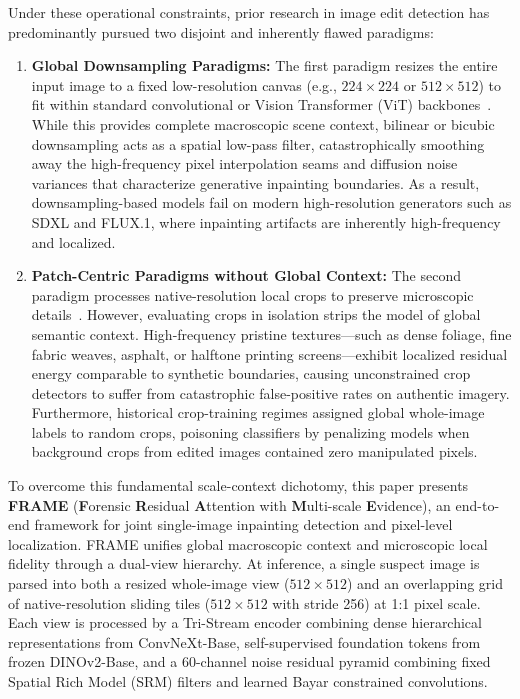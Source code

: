 Under these operational constraints, prior research in image edit detection has predominantly pursued two disjoint and inherently flawed paradigms:
\begin{enumerate}
    \item \textbf{Global Downsampling Paradigms:} The first paradigm resizes the entire input image to a fixed low-resolution canvas (e.g., $224 \times 224$ or $512 \times 512$) to fit within standard convolutional or Vision Transformer (ViT) backbones~\cite{opensdi,fused,cnndet}. While this provides complete macroscopic scene context, bilinear or bicubic downsampling acts as a spatial low-pass filter, catastrophically smoothing away the high-frequency pixel interpolation seams and diffusion noise variances that characterize generative inpainting boundaries. As a result, downsampling-based models fail on modern high-resolution generators such as SDXL and FLUX.1, where inpainting artifacts are inherently high-frequency and localized.
    \item \textbf{Patch-Centric Paradigms without Global Context:} The second paradigm processes native-resolution local crops to preserve microscopic details~\cite{trufor,mvss}. However, evaluating crops in isolation strips the model of global semantic context. High-frequency pristine textures---such as dense foliage, fine fabric weaves, asphalt, or halftone printing screens---exhibit localized residual energy comparable to synthetic boundaries, causing unconstrained crop detectors to suffer from catastrophic false-positive rates on authentic imagery. Furthermore, historical crop-training regimes assigned global whole-image labels to random crops, poisoning classifiers by penalizing models when background crops from edited images contained zero manipulated pixels.
\end{enumerate}

To overcome this fundamental scale-context dichotomy, this paper presents \textbf{FRAME} (\textbf{F}orensic \textbf{R}esidual \textbf{A}ttention with \textbf{M}ulti-scale \textbf{E}vidence), an end-to-end framework for joint single-image inpainting detection and pixel-level localization. FRAME unifies global macroscopic context and microscopic local fidelity through a dual-view hierarchy. At inference, a single suspect image is parsed into both a resized whole-image view ($512 \times 512$) and an overlapping grid of native-resolution sliding tiles ($512 \times 512$ with stride 256) at 1:1 pixel scale. Each view is processed by a Tri-Stream encoder combining dense hierarchical representations from ConvNeXt-Base, self-supervised foundation tokens from frozen DINOv2-Base, and a 60-channel noise residual pyramid combining fixed Spatial Rich Model (SRM) filters and learned Bayar constrained convolutions.

